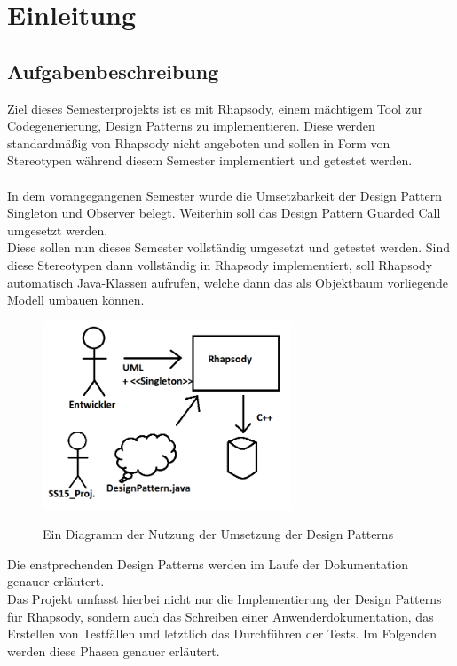 \chapter{Einleitung}

\section{Aufgabenbeschreibung}

Ziel dieses Semesterprojekts ist es mit Rhapsody, einem mächtigem Tool zur Codegenerierung, Design Patterns zu implementieren. Diese werden standardmäßig von Rhapsody nicht angeboten und sollen in Form von Stereotypen während diesem Semester implementiert und getestet werden. \\
\\
In dem vorangegangenen Semester wurde die Umsetzbarkeit der Design Pattern Singleton und Observer belegt. Weiterhin soll das Design Pattern Guarded Call umgesetzt werden. \\
Diese sollen nun dieses Semester vollständig umgesetzt und getestet werden. Sind diese Stereotypen dann vollständig in Rhapsody implementiert, soll Rhapsody automatisch Java-Klassen aufrufen, welche dann das als Objektbaum vorliegende Modell umbauen können.\\

\begin{figure}[!htbp]
	\centering
	\includegraphics[width=0.66\textwidth]{content/pictures/Simplification}
	\label{pic:bild}
	\caption{Ein Diagramm der Nutzung der Umsetzung der Design Patterns}
\end{figure}

Die enstprechenden Design Patterns werden im Laufe der Dokumentation genauer erläutert.\\
Das Projekt umfasst hierbei nicht nur die Implementierung der Design Patterns für Rhapsody, sondern auch das Schreiben einer Anwenderdokumentation, das Erstellen von Testfällen und letztlich das Durchführen der Tests. Im Folgenden werden diese Phasen genauer erläutert.

